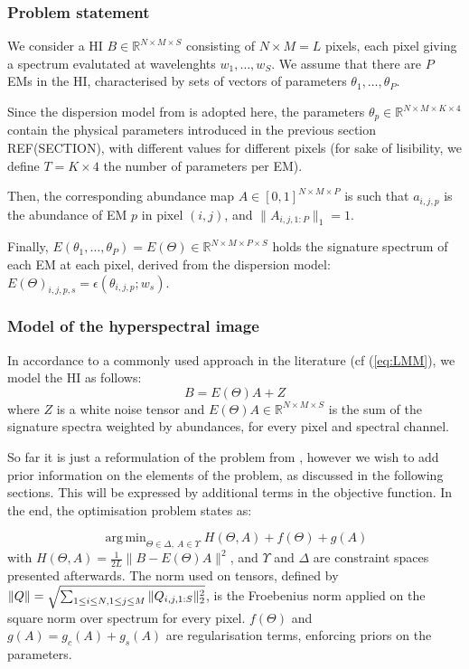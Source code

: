 \documentclass{article}
\DeclareMathOperator*{\argmin}{arg\,min}
\begin{document}
\subsubsection{Problem statement}

We consider a HI $B \in \mathbb{R}^{N \times M \times S}$ consisting of $N \times M = L$ pixels, each pixel giving a spectrum evalutated at wavelenghts $w_1,\dots, w_S$. We assume that there are $P$ EMs in the HI, characterised by sets of vectors of parameters $\theta_1,\dots, \theta_P$.

Since the dispersion model from \citet{janiczek_differentiable_2020} is adopted here, the parameters $\theta_p \in \mathbb{R}^{N \times M \times K \times 4}$ contain the physical parameters introduced in the previous section REF(SECTION), with different values for different pixels (for sake of lisibility, we define $T = K \times 4$ the number of parameters per EM).

Then, the corresponding abundance map $A \in [0, 1]^{N \times M\times P}$ is such that $a_{i, j, p}$ is the abundance of EM $p$ in pixel $(i, j)$, and $\|A_{i, j, 1:P}\|_1 = 1$.

Finally, $E(\theta_1,\dots, \theta_P) = E(\Theta) \in \mathbb{R}^{N \times M \times P \times S}$ holds the signature spectrum of each EM at each pixel, derived from the dispersion model: $E(\Theta)_{i, j, p, s} = \epsilon(\theta_{i, j, p}; w_s)$.

\subsubsection{Model of the hyperspectral image}

In accordance to a commonly used approach in the literature (cf (\ref{eq:LMM}), we model the HI as follows:
$$B = E(\Theta) A + Z$$
where $Z$ is a white noise tensor and $E(\Theta) A \in \mathbb{R}^{N \times M \times S}$ is the sum of the signature spectra weighted by abundances, for every pixel and spectral channel.

So far it is just a reformulation of the problem from \cite{janiczek_differentiable_2020}, however we wish to add prior information on the elements of the problem, as discussed in the following sections. This will be expressed by additional terms in the objective function. In the end, the optimisation problem states as:

\begin{equation}
  \label{eq:objective}
  \argmin_{\Theta \in \Delta,\ A \in \Upsilon} H(\Theta, A) + f(\Theta) + g(A)
\end{equation}
with $H(\Theta, A) = \frac{1}{2 L} \|B - E(\Theta) A\|^2$, and $\Upsilon$ and $\Delta$ are constraint spaces presented afterwards. The norm used on tensors, defined by $\|Q\| = \sqrt{\sum_{1 \leq i \leq N,\\1 \leq j \leq M} \|Q_{i, j, 1:S}\|_2^2}$, is the Froebenius norm applied on the square norm over spectrum for every pixel. $f(\Theta)$ and $g(A) = g_c(A) + g_s(A)$ are regularisation terms, enforcing priors on the parameters.
\end{document}
